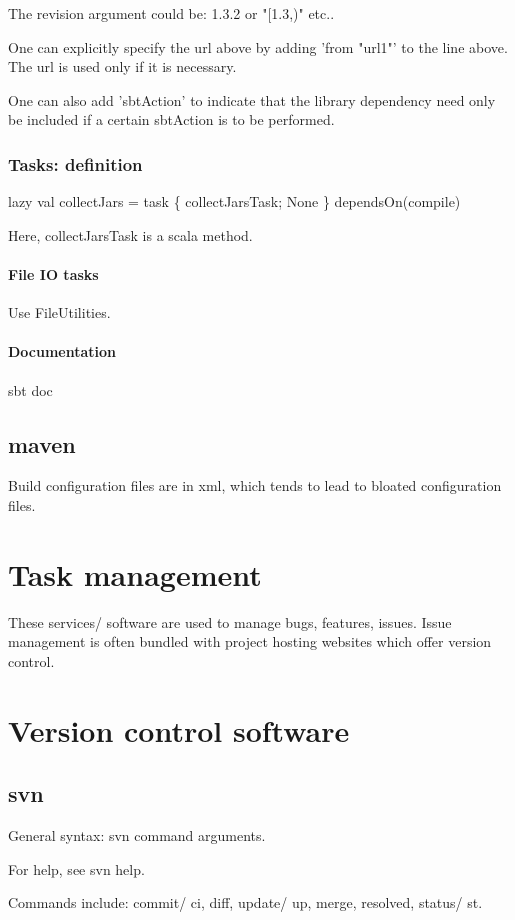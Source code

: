 \documentclass[oneside, article]{memoir}
\begin{document}
The revision argument could be: 1.3.2 or "[1.3,)" etc..

One can explicitly specify the url above by adding 'from "url1"' to the line above. The url is used only if it is necessary.

One can also add 'sbtAction' to indicate that the library dependency need only be included if a certain sbtAction is to be performed. \chk

\subsection{Tasks: definition}
lazy val collectJars = task \{ collectJarsTask; None \} dependsOn(compile)

Here, collectJarsTask is a scala method.

\subsubsection{File IO tasks}
Use FileUtilities.

\subsubsection{Documentation}
sbt doc

\section{maven}
Build configuration files are in xml, which tends to lead to bloated configuration files. 

\chapter{Task management}
These services/ software are used to manage bugs, features, issues. Issue management is often bundled with project hosting websites which offer version control.

\chapter{Version control software}
\section{svn}
General syntax: svn command arguments.

For help, see svn help.

Commands include: commit/ ci, diff, update/ up, merge, resolved, status/ st.
\end{document}
